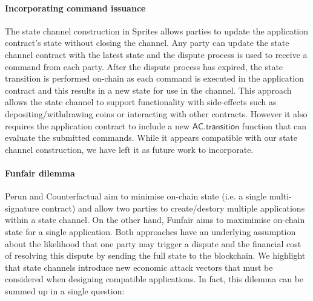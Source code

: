 \documentclass{llncs}
\begin{document}

\paragraph{Incorporating command issuance} 
The state channel construction in Sprites allows parties to update the application contract's state without closing the channel.
Any party can update the state channel contract with the latest state and the dispute process is used to receive a command from each party.
After the dispute process has expired, the state transition is performed on-chain as each command is executed in the application contract and this results in a new state for use in the channel. 
This approach allows the state channel to support functionality with side-effects such as depositing/withdrawing coins or interacting with other contracts.
However it also requires the application contract to include a new $\mathsf{AC.transition}$ function that can evaluate the submitted commands.
While it appears compatible with our state channel construction, we have left it as future work to incorporate. 


\paragraph{Funfair dilemma} 
Perun and Counterfactual aim to minimise on-chain state (i.e. a single multi-signature contract) and allow two parties to create/destory multiple applications within a state channel. 
On the other hand, Funfair aims to maximimise on-chain state for a single application. 
Both approaches have an underlying assumption about the likelihood that one party may trigger a dispute and the financial cost of resolving this dispute by sending the full state to the blockchain.
We highlight that state channels introduce new economic attack vectors that must be considered when designing compatible applications.
In fact, this dilemma can be summed up in a single question:
\end{document}
